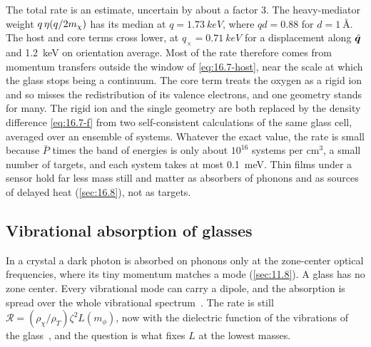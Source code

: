 The total rate is an estimate, uncertain by about a factor 3. The heavy-mediator weight $q\,\eta(q/2m_{\chi})$ has its median at $q = \SI{1.73}{keV}$, where $qd = 0.88$ for $d = \SI{1}{\angstrom}$. The host and core terms cross lower, at $q_\times = \SI{0.71}{keV}$ for a displacement along $\hat{\bm{q}}$ and \SI{1.2}{keV} on orientation average. Most of the rate therefore comes from momentum transfers outside the window of \cref{eq:16.7-host}, near the scale at which the glass stops being a continuum. The core term treats the oxygen as a rigid ion and so misses the redistribution of its valence electrons, and one geometry stands for many. The rigid ion and the single geometry are both replaced by the density difference \cref{eq:16.7-f} from two self-consistent calculations of the same glass cell, averaged over an ensemble of systems. Whatever the exact value, the rate is small because $\bar P$ times the band of energies is only about $10^{16}$ systems per cm$^3$, a small number of targets, and each system takes at most \SI{0.1}{meV}. Thin films under a sensor hold far less mass still and matter as absorbers of phonons and as sources of delayed heat (\cref{sec:16.8}), not as targets.

\subsection{Vibrational absorption of glasses}\label{sec:16.7-ir}

In a crystal a dark photon is absorbed on phonons only at the zone-center optical frequencies, where its tiny momentum matches a mode (\cref{sec:11.8}). A glass has no zone center. Every vibrational mode can carry a dipole, and the absorption is spread over the whole vibrational spectrum~\cite{bloch2026dark}. The rate is still $\mathcal{R} = (\rho_\chi/\rho_T)\zeta^2L(m_\phi)$, now with the dielectric function of the vibrations of the glass~\cite[Eq.~(2)]{bloch2026dark}, and the question is what fixes $L$ at the lowest masses.

